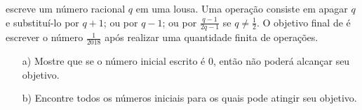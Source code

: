  escreve um número racional $q$ em uma lousa. Uma operação consiste em apagar $q$ e substituí-lo por $q + 1$; ou por $q - 1$; ou por $\frac{q-1}{2q-1}$ se $q \neq \frac{1}{2}$. O objetivo final de  é escrever o número $\frac{1}{2018}$ após realizar uma quantidade finita de operações.

\begin{enumerate}[label = (\alph*)]
    \item[a)] Mostre que se o número inicial escrito é 0, então  não poderá alcançar seu objetivo.
    
    \item[b)] Encontre todos os números iniciais para os quais  pode atingir seu objetivo.
\end{enumerate}
